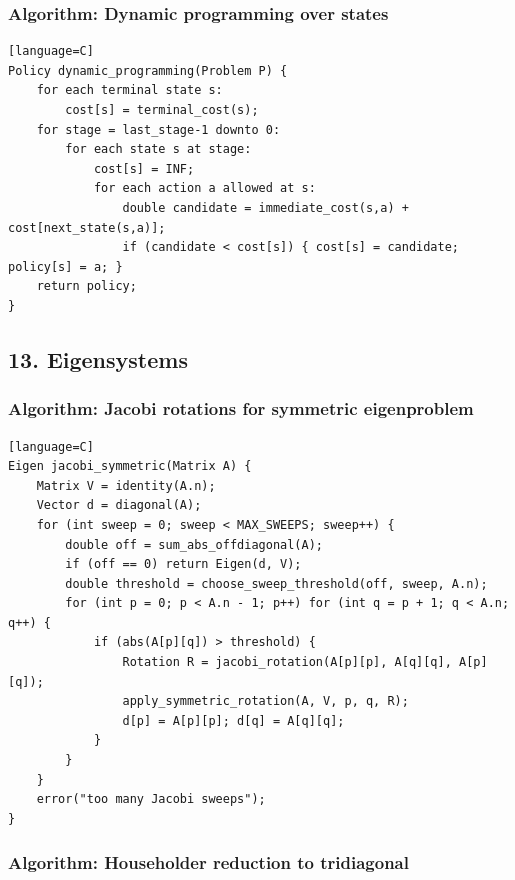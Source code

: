 \documentclass[11pt]{article}
\begin{document}
\subsubsection{Algorithm: Dynamic programming over states}\label{algorithm-dynamic-programming-over-states}

\begin{verbatim}[language=C]
Policy dynamic_programming(Problem P) {
    for each terminal state s:
        cost[s] = terminal_cost(s);
    for stage = last_stage-1 downto 0:
        for each state s at stage:
            cost[s] = INF;
            for each action a allowed at s:
                double candidate = immediate_cost(s,a) + cost[next_state(s,a)];
                if (candidate < cost[s]) { cost[s] = candidate; policy[s] = a; }
    return policy;
}
\end{verbatim}

\subsection{13. Eigensystems}\label{eigensystems}

\subsubsection{Algorithm: Jacobi rotations for symmetric eigenproblem}\label{algorithm-jacobi-rotations-for-symmetric-eigenproblem}

\begin{verbatim}[language=C]
Eigen jacobi_symmetric(Matrix A) {
    Matrix V = identity(A.n);
    Vector d = diagonal(A);
    for (int sweep = 0; sweep < MAX_SWEEPS; sweep++) {
        double off = sum_abs_offdiagonal(A);
        if (off == 0) return Eigen(d, V);
        double threshold = choose_sweep_threshold(off, sweep, A.n);
        for (int p = 0; p < A.n - 1; p++) for (int q = p + 1; q < A.n; q++) {
            if (abs(A[p][q]) > threshold) {
                Rotation R = jacobi_rotation(A[p][p], A[q][q], A[p][q]);
                apply_symmetric_rotation(A, V, p, q, R);
                d[p] = A[p][p]; d[q] = A[q][q];
            }
        }
    }
    error("too many Jacobi sweeps");
}
\end{verbatim}

\subsubsection{Algorithm: Householder reduction to tridiagonal}\label{algorithm-householder-reduction-to-tridiagonal}
\end{document}
